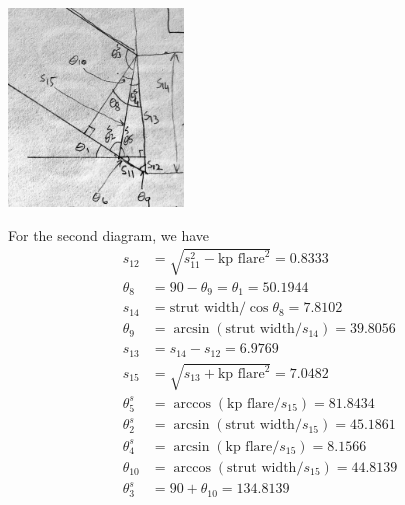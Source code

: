 \documentclass{article}\usepackage[]{graphicx}\usepackage[]{xcolor}
\begin{document}
\begin{center}
	\includegraphics[width=0.35\textwidth]{images/strut_kp_detail}
\end{center}

For the second diagram, we have 
\begin{align*}
  s_{12} &= \sqrt{s_{11}^2 - \text{kp flare}^2} = 0.8333\\
  \theta_8 &= 90 - \theta_9 = \theta_1 = 50.1944\\
  s_{14} &= \text{strut width}/\cos\theta_8 = 7.8102\\
  \theta_9 &= \arcsin(\text{strut width}/s_{14}) = 39.8056\\
  s_{13} &= s_{14} - s_{12} = 6.9769\\
  s_{15} &= \sqrt{s_{13} + \text{kp flare}^2} = 7.0482\\
  \theta_5^s &= \arccos(\text{kp flare}/s_{15}) = 81.8434\\
  \theta_2^s &= \arcsin(\text{strut width}/s_{15}) = 45.1861\\
  \theta_4^s &= \arcsin(\text{kp flare}/s_{15}) = 8.1566\\
  \theta_{10} &= \arccos(\text{strut width}/s_{15}) = 44.8139\\
  \theta_3^s &= 90 + \theta_{10} = 134.8139
\end{align*}

\begin{center}
\end{center}

\begin{center}
\end{center}

\begin{center}
\end{center}
\end{document}
